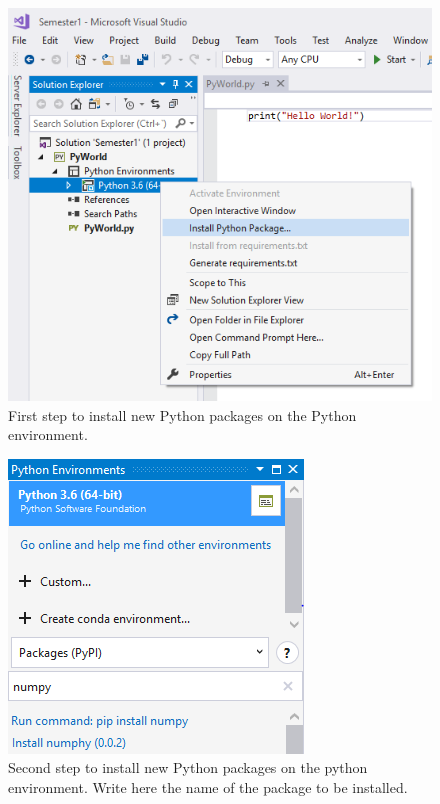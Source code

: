 \begin{figure}[h]
    \centering
    \includegraphics[width= 0.9 \textwidth]{Figures/PPM0V1.png}
    \caption{First step to install new Python packages on the Python environment.}
    \label{fig:pkg0}
\end{figure}

\begin{figure}[h]
    \centering
    \includegraphics[width=0.6 \textwidth]{Figures/PPM1V2.png}
    \caption{Second step to install new Python packages on the python environment. Write here the name of the package to be installed.}
    \label{fig:pkg1}
\end{figure}

